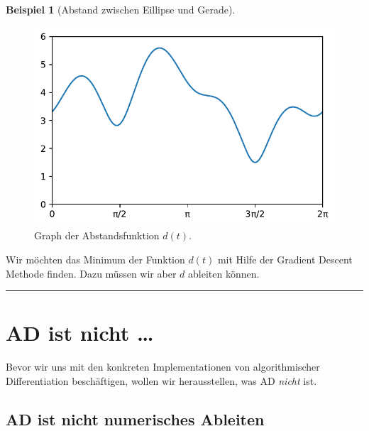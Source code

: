 \documentclass[
  letterpaper,
  DIV=11,
  oneside]{scrreprt}
\theoremstyle{definition}
\theoremstyle{definition}
\newtheorem{example}{Beispiel}[chapter]
\theoremstyle{remark}
\begin{document}
\begin{example}[Abstand zwischen Eillipse und
Gerade]
\begin{figure}[H]

{\centering \includegraphics{./intro_files/figure-pdf/fig-graphofdistanceproblem-output-1.pdf}

}

\caption{\label{fig-graphofdistanceproblem}Graph der Abstandsfunktion
\(d(t)\).}

\end{figure}

Wir möchten das Minimum der Funktion \(d(t)\) mit Hilfe der Gradient
Descent Methode finden. Dazu müssen wir aber \(d\) ableiten können.

\end{example}

\begin{center}\rule{0.5\linewidth}{0.5pt}\end{center}


\hypertarget{sec-ADisnot}{%
\chapter{AD ist nicht \ldots{}}\label{sec-ADisnot}}

Bevor wir uns mit den konkreten Implementationen von algorithmischer
Differentiation beschäftigen, wollen wir herausstellen, was AD
\emph{nicht} ist.

\hypertarget{sec-ADnotNumDiff}{%
\section{AD ist nicht numerisches Ableiten}\label{sec-ADnotNumDiff}}
\end{document}
